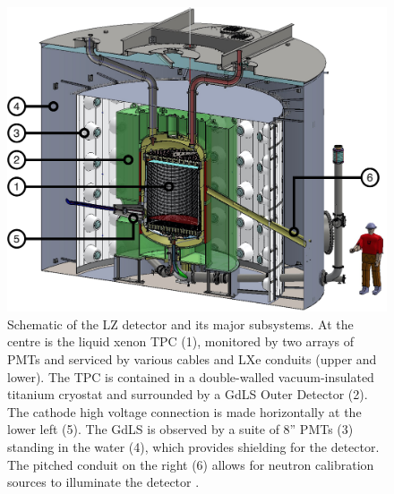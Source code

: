 \begin{figure}[!ht]
    \centering
    \includegraphics[width=0.7\linewidth]{figures/LZ/LZSchematic.pdf}
    \caption[Schematic of the LZ detector and its major subsystems.]{Schematic of the LZ detector and its major subsystems. At the centre is the liquid xenon TPC (1), monitored by two arrays of PMTs and serviced by various cables and LXe conduits (upper and lower). The TPC is contained in a double-walled vacuum-insulated titanium cryostat and surrounded by a GdLS Outer Detector (2). The cathode high voltage connection is made horizontally at the lower left (5). The GdLS is observed by a suite of 8” PMTs (3) standing in the water (4), which provides shielding for the detector. The pitched conduit on the right (6) allows for neutron calibration sources to illuminate the detector \cite{LZNIMA}.}
    \label{fig:LZ/LZDetector}
\end{figure}
